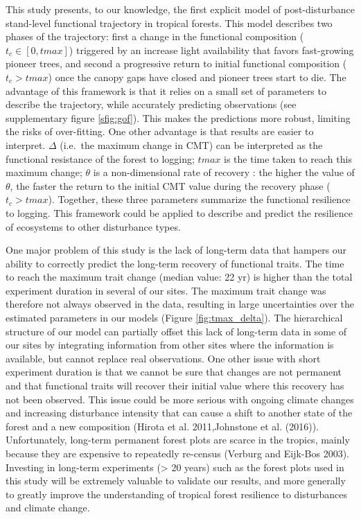 \documentclass[]{elsarticle} %
\begin{document}
This study presents, to our knowledge, the first explicit model of
post-disturbance stand-level functional trajectory in tropical forests.
This model describes two phases of the trajectory: first a change in the
functional composition (\(t_c \in [0,tmax]\)) triggered by an increase
light availability that favors fast-growing pioneer trees, and second a
progressive return to initial functional composition (\(t_c > tmax\))
once the canopy gaps have closed and pioneer trees start to die. The
advantage of this framework is that it relies on a small set of
parameters to describe the trajectory, while accurately predicting
observations (see supplementary figure \ref{sfig:gof}). This makes the
predictions more robust, limiting the risks of over-fitting. One other
advantage is that results are easier to interpret. \(\Delta\) (i.e.~the
maximum change in CMT) can be interpreted as the functional resistance
of the forest to logging; \(tmax\) is the time taken to reach this
maximum change; \(\theta\) is a non-dimensional rate of recovery : the
higher the value of \(\theta\), the faster the return to the initial CMT
value during the recovery phase (\(t_c > tmax\)). Together, these three
parameters summarize the functional resilience to logging. This
framework could be applied to describe and predict the resilience of
ecosystems to other disturbance types.

One major problem of this study is the lack of long-term data that
hampers our ability to correctly predict the long-term recovery of
functional traits. The time to reach the maximum trait change (median
value: 22 yr) is higher than the total experiment duration in several of
our sites. The maximum trait change was therefore not always observed in
the data, resulting in large uncertainties over the estimated parameters
in our models (Figure \ref{fig:tmax_delta}). The hierarchical structure
of our model can partially offset this lack of long-term data in some of
our sites by integrating information from other sites where the
information is available, but cannot replace real observations. One
other issue with short experiment duration is that we cannot be sure
that changes are not permanent and that functional traits will recover
their initial value where this recovery has not been observed. This
issue could be more serious with ongoing climate changes and increasing
disturbance intensity that can cause a shift to another state of the
forest and a new composition (Hirota et al. 2011,Johnstone et al.
(2016)). Unfortunately, long-term permanent forest plots are scarce in
the tropics, mainly because they are expensive to repeatedly re-census
(Verburg and Eijk-Bos 2003). Investing in long-term experiments
(\textgreater{} 20 years) such as the forest plots used in this study
will be extremely valuable to validate our results, and more generally
to greatly improve the understanding of tropical forest resilience to
disturbances and climate change.
\end{document}
